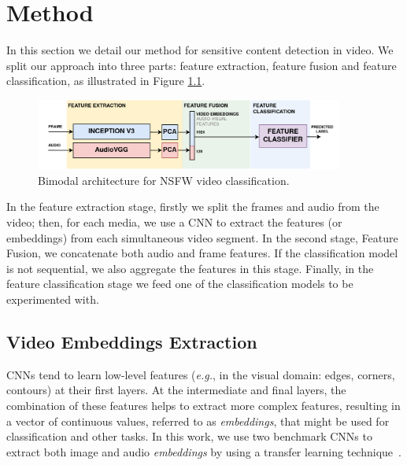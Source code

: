 \newpage

\chapter{Method}
\label{chap:method}
In this section we detail our method for sensitive content detection in video. We split our approach into three parts: feature extraction, feature fusion and feature classification, as illustrated in Figure \ref{fig:model}.
\begin{figure}[!ht]
    \centering
    \includegraphics[width=0.9\textwidth]{img/model-2.png}
    \caption{Bimodal architecture for NSFW video classification.}
    \label{fig:model}
    \vspace{-1em}
\end{figure}

In the feature extraction stage, firstly we split the frames and audio from the video; then, for each media, we use a CNN to extract the features (or embeddings) from each simultaneous video segment. In the second stage, Feature Fusion, we concatenate both audio and frame features. If the classification model is not sequential, we also aggregate the features in this stage. Finally, in the feature classification stage we feed one of the classification models to be experimented with.

\section{Video Embeddings Extraction}
\label{sec:video_features}

CNNs tend to learn low-level features (\textit{e.g.}, in the visual domain: edges, corners, contours) at their first layers. At the intermediate and final layers, the combination of these features helps to extract more complex features, resulting in a vector of continuous values, referred to as \textit{embeddings}, that might be used for classification and other tasks. In this work, we use two benchmark CNNs to extract both image and audio \textit{embeddings} by using a transfer learning technique~\cite{tan2018survey}.




